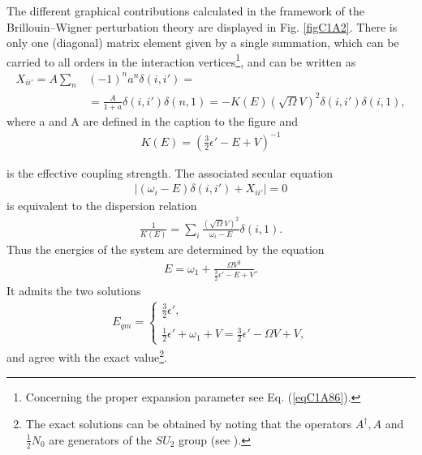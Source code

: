 The different graphical contributions calculated in the framework of the
Brillouin--Wigner perturbation theory are displayed in Fig. \ref{figC1A2}. There is only
one (diagonal) matrix element given by a single summation, which can be
carried to all orders in the interaction vertices\footnote{Concerning the proper expansion parameter see Eq. (\ref{eqC1A86}).}, and can be written as
 \begin{align}\label{eqC1A31} 
\nonumber X_{ii'}=A\sum_n&(-1)^na^n\delta(i,i')=\\
&=\frac{A}{1+a}\delta(i,i')\delta(n,1)=-K(E)(\sqrt{\Omega}V)^2\delta(i,i')\delta(i,1),
 \end{align}
where a and A are defined in the caption to the figure and
 \begin{align}\label{eqC1A32} 
K(E)=\left(\tfrac{3}{2}\epsilon'-E+V\right)^{-1}
 \end{align}
 
is the effective coupling strength. The associated secular equation
 \begin{align}\label{eqC1A33} 
\left|(\omega_i-E)\delta(i,i')+X_{ii'}\right|=0
 \end{align}
is equivalent to the dispersion relation
 \begin{align}\label{eqC1A34} 
\frac{1}{K(E)}=\sum_i\frac{\left(\sqrt{\Omega}V\right)^2}{\omega_i-E}\delta(i,1).
 \end{align}
Thus the energies of the system are determined by the equation
 \begin{align}\label{eqC1A35} 
E=\omega_1+\frac{\Omega V^2}{\tfrac{3}{2}\epsilon'-E+V}.
 \end{align}
It admits the two solutions
 \begin{align}\label{eqC1A36} 
E_{qm}=\left\{\begin{array}{l}
\frac{3}{2}\epsilon', \\ 
\\
\frac{1}{2}\epsilon'+\omega_1+V=\frac{3}{2}\epsilon'-\Omega V+V,
\end{array} 
\right.
 \end{align}
and agree with the exact value\footnote{The exact solutions can be  obtained  by noting that the operators $A^\dagger,A$ and $\frac{1}{2}N_0$ are generators of the $SU_2$ group (see \cite{Bortignon:77}).}.


